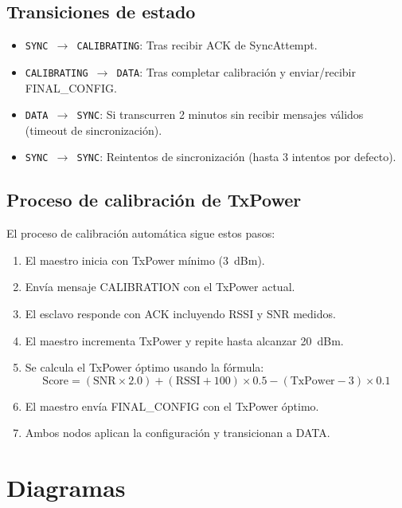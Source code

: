 \documentclass[11pt,a4paper]{article}
\begin{document}
\subsection{Transiciones de estado}
\begin{itemize}
  \item \texttt{SYNC $\rightarrow$ CALIBRATING}: Tras recibir ACK de SyncAttempt.
  \item \texttt{CALIBRATING $\rightarrow$ DATA}: Tras completar calibración y enviar/recibir FINAL\_CONFIG.
  \item \texttt{DATA $\rightarrow$ SYNC}: Si transcurren 2 minutos sin recibir mensajes válidos (timeout de sincronización).
  \item \texttt{SYNC $\rightarrow$ SYNC}: Reintentos de sincronización (hasta 3 intentos por defecto).
\end{itemize}

\subsection{Proceso de calibración de TxPower}
El proceso de calibración automática sigue estos pasos:
\begin{enumerate}
  \item El maestro inicia con TxPower mínimo (3~dBm).
  \item Envía mensaje CALIBRATION con el TxPower actual.
  \item El esclavo responde con ACK incluyendo RSSI y SNR medidos.
  \item El maestro incrementa TxPower y repite hasta alcanzar 20~dBm.
  \item Se calcula el TxPower óptimo usando la fórmula:
    \[ \text{Score} = (\text{SNR} \times 2.0) + (\text{RSSI} + 100) \times 0.5 - (\text{TxPower} - 3) \times 0.1 \]
  \item El maestro envía FINAL\_CONFIG con el TxPower óptimo.
  \item Ambos nodos aplican la configuración y transicionan a DATA.
\end{enumerate}

\section{Diagramas}
\end{document}

